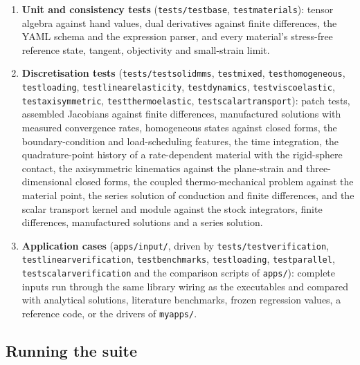 \documentclass[11pt]{article}
\DeclareRobustCommand{\file}[1]{{\def\_{\textunderscore\allowbreak}\texttt{#1}}}
\begin{document}
\begin{enumerate}[nosep]
  \item \textbf{Unit and consistency tests} (\file{tests/test\_base},
    \file{test\_materials}): tensor algebra against hand values, dual
    derivatives against finite differences, the YAML schema and the
    expression parser, and every material's stress-free reference state,
    tangent, objectivity and small-strain limit.
  \item \textbf{Discretisation tests} (\file{tests/test\_solid\_mms},
    \file{test\_mixed}, \file{test\_homogeneous}, \file{test\_loading},
    \file{test\_linear\_elasticity}, \file{test\_dynamics},
    \file{test\_viscoelastic}, \file{test\_axisymmetric},
    \file{test\_thermoelastic}, \file{test\_scalar\_transport}):
    patch tests, assembled Jacobians against finite differences, manufactured
    solutions with measured convergence rates, homogeneous states against
    closed forms, the boundary-condition and load-scheduling features, the
    time integration, the quadrature-point history of a rate-dependent
    material with the rigid-sphere contact, the axisymmetric kinematics
    against the plane-strain and three-dimensional closed forms, the
    coupled thermo-mechanical problem against the material point, the
    series solution of conduction and finite differences, and the scalar
    transport kernel and module against the stock integrators, finite
    differences, manufactured solutions and a series solution.
  \item \textbf{Application cases} (\file{apps/input/}, driven by
    \file{tests/test\_verification}, \file{test\_linear\_verification},
    \file{test\_benchmarks}, \file{test\_loading}, \file{test\_parallel},
    \file{test\_scalar\_verification} and the comparison scripts of
    \file{apps/}): complete inputs run through the same library wiring as
    the executables and compared with analytical solutions, literature
    benchmarks, frozen regression values, a reference code, or the drivers
    of \file{myapps/}.
\end{enumerate}

\subsection{Running the suite}
\end{document}
